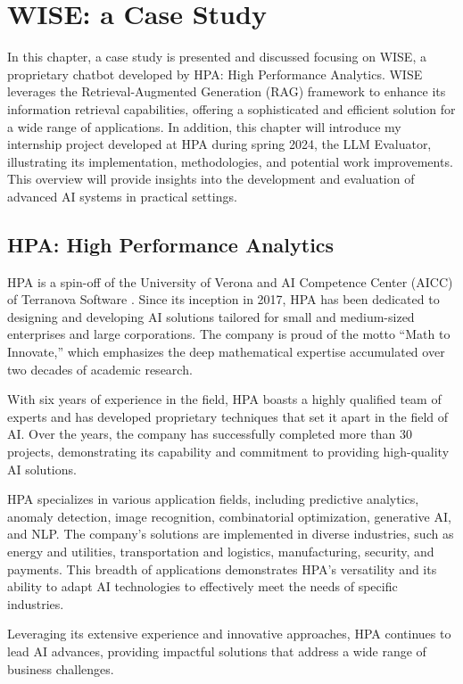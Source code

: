 \section{WISE: a Case Study}

In this chapter, a case study is presented and discussed  focusing on WISE, a proprietary chatbot developed by HPA: High Performance Analytics. WISE leverages the Retrieval-Augmented Generation (RAG) framework to enhance its information retrieval capabilities, offering a sophisticated and efficient solution for a wide range of applications. In addition, this chapter will introduce my internship project developed at HPA during spring 2024, the LLM Evaluator, illustrating its implementation, methodologies, and potential work improvements. This overview will provide insights into the development and evaluation of advanced AI systems in practical settings.

\subsection{HPA: High Performance Analytics}

HPA is a spin-off of the University of Verona and AI Competence Center (AICC) of Terranova Software \cite{terranova2024}. Since its inception in 2017, HPA has been dedicated to designing and developing AI solutions tailored for small and medium-sized enterprises and large corporations. The company is proud of the motto “Math to Innovate,” which emphasizes the deep mathematical expertise accumulated over two decades of academic research.

With six years of experience in the field, HPA boasts a highly qualified team of experts and has developed proprietary techniques that set it apart in the field of AI. Over the years, the company has successfully completed more than 30 projects, demonstrating its capability and commitment to providing high-quality AI solutions.

HPA specializes in various application fields, including predictive analytics, anomaly detection, image recognition, combinatorial optimization, generative AI, and NLP. The company's solutions are implemented in diverse industries, such as energy and utilities, transportation and logistics, manufacturing, security, and payments. This breadth of applications demonstrates HPA's versatility and its ability to adapt AI technologies to effectively meet the needs of specific industries.

Leveraging its extensive experience and innovative approaches, HPA continues to lead AI advances, providing impactful solutions that address a wide range of business challenges.

